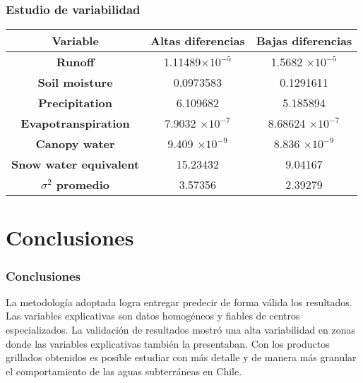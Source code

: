 \documentclass{beamer}
\begin{document}
  \begin{frame}
    \frametitle{Estudio de variabilidad}
    \centering
    \begin{tabular}{|c|c|c|}
      \hline
      \textbf{Variable}	& \textbf{Altas diferencias}	& \textbf{Bajas diferencias} \\
      \hline
      \textbf{Runoff}		                 & 1.11489$\times 10^{-5}$    & 1.5682 $\times 10^{-5}$  \\
      \textbf{Soil moisture}		         & 0.0973583                  & 0.1291611\\
      \textbf{Precipitation}		         & 6.109682                   & 5.185894\\
      \textbf{Evapotranspiration}	       & 7.9032 $\times 10^{-7}$    & 8.68624 $\times 10^{-7}$\\
      \textbf{Canopy water}		           & 9.409  $\times 10^{-9}$    & 8.836  $\times 10^{-9}$\\
      \textbf{Snow water equivalent}	   & 15.23432                   & 9.04167 \\
      \hline
      \textbf{$\sigma^2$ promedio}         & 3.57356                    & 2.39279\\
      \hline
    \end{tabular}
  \end{frame}
  \section{Conclusiones}

  \begin{frame}
    \frametitle{Conclusiones}

    \begin{outline}
      \1 La metodología adoptada logra entregar predecir de forma válida los resultados.
      \1 Las variables explicativas son datos homogéneos y fiables de centros especializados.
      \1 La validación de resultados mostró una alta variabilidad en zonas donde las variables explicativas también la presentaban.
      \1 Con los productos grillados obtenidos es posible estudiar con más detalle y de manera más granular el comportamiento
      de las aguas subterráneas en Chile.
      
    \end{outline}
  \end{frame}
\end{document}
